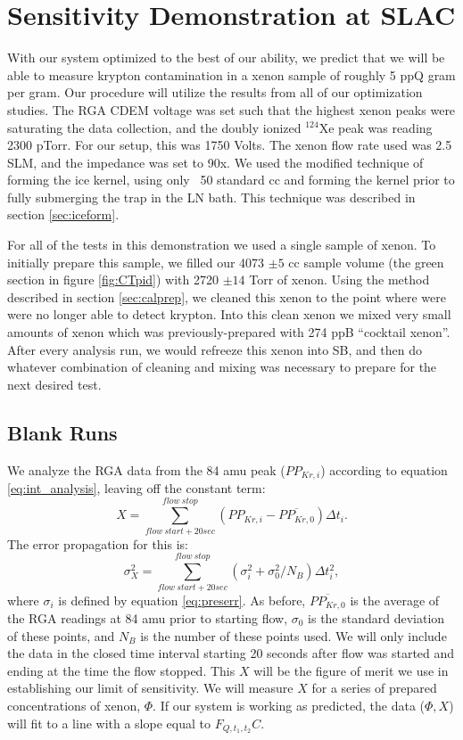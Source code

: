 \documentclass[12pt]{article}
\begin{document}
\section{Sensitivity Demonstration at SLAC}
With our system optimized to the best of our ability, we predict that we will be able to measure krypton contamination in a xenon sample of roughly 5 ppQ gram per gram. Our procedure will utilize the results from all of our optimization studies. The RGA CDEM voltage was set such that the highest xenon peaks were saturating the data collection, and the doubly ionized $^{124}$Xe peak was reading 2300 pTorr. For our setup, this was 1750 Volts. The xenon flow rate used was 2.5 SLM, and the impedance was set to 90x. We used the modified technique of forming the ice kernel, using only ~50 standard cc and forming the kernel prior to fully submerging the trap in the LN bath. This technique was described in section \ref{sec:iceform}. 

For all of the tests in this demonstration we used a single sample of xenon. To initially prepare this sample, we filled our 4073 $\pm 5$ cc sample volume (the green section in figure \ref{fig:CTpid}) with 2720 $\pm 14$ Torr of xenon. Using the method described in section \ref{sec:calprep}, we cleaned this xenon to the point where were were no longer able to detect krypton. Into this clean xenon we mixed very small amounts of xenon which was previously-prepared with 274 ppB ``cocktail xenon''. After every analysis run, we would refreeze this xenon into SB, and then do whatever combination of cleaning and mixing was necessary to prepare for the next desired test.

\subsection{Blank Runs}
We analyze the RGA data from the 84 amu peak ($PP_{Kr,i}$) according to equation \ref{eq:int_analysis}, leaving off the constant term:
\begin{equation}
\label{eq:SLACintan}
X=\sum_{flow \  start+20sec}^{flow \ stop}(PP_{Kr,i}-\overline{PP_{Kr,0}})\Delta t_i.
\end{equation}
The error propagation for this is:
\begin{equation}
\sigma_{X}^2=\sum_{flow \  start+20sec}^{flow \ stop}(\sigma_i^2+\sigma_0^2/N_B)\Delta t_i^2,
\end{equation}
where $\sigma_i$ is defined by equation \ref{eq:preserr}. As before, $\overline{PP_{Kr,0}}$ is the average of the RGA readings at 84 amu prior to starting flow, $\sigma_0$ is the standard deviation of these points, and $N_B$ is the number of these points used. We will only include the data in the closed time interval starting 20 seconds after flow was started and ending at the time the flow stopped. This $X$ will be the figure of merit we use in establishing our limit of sensitivity. We will measure $X$ for a series of prepared concentrations of xenon, $\Phi$. If our system is working as predicted, the data ($\Phi,X$) will fit to a line with a slope equal to $F_{Q,t_1,t_2}C$.
\end{document}
